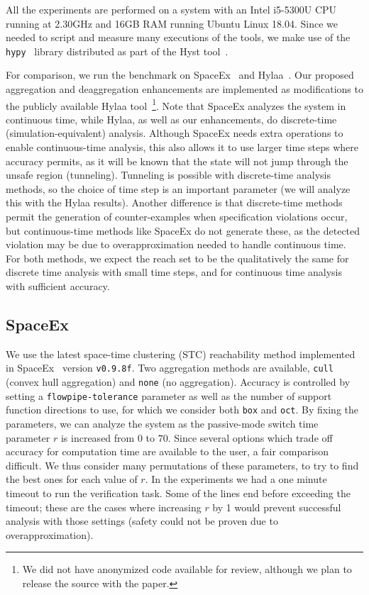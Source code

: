 All the experiments are performed on a system with an Intel i5-5300U CPU running at 2.30GHz and 16GB RAM running Ubuntu Linux 18.04.
%
Since we needed to script and measure many executions of the tools, we make use of the \texttt{hypy}~\cite{hypy} library distributed as part of the
Hyst tool~\cite{bak2015hscc}.

For comparison, we run the benchmark on SpaceEx~\cite{spaceex} and Hylaa~\cite{bak2017hscc}.
%
Our proposed aggregation and deaggregation enhancements are implemented as modifications to the publicly available
Hylaa tool~\footnote{We did not have anonymized code available for review, although we plan to release the source with the paper.}.
%
Note that SpaceEx analyzes the system in continuous time, while Hylaa, as well as our enhancements, do discrete-time (simulation-equivalent) analysis.
%
Although SpaceEx needs extra operations to enable continuous-time analysis, this also allows it to use larger time steps where accuracy permits, as
it will be known that the state will not jump through the unsafe region (tunneling).
%
Tunneling is possible with discrete-time analysis methods, so the choice of time step is an important parameter (we will analyze this with the Hylaa results).
%
Another difference is that discrete-time methods permit the generation of counter-examples when specification violations occur, but continuous-time methods
like SpaceEx do not generate these, as the detected violation may be due to overapproximation needed to handle continuous time.
%
For both methods, we expect the reach set to be the qualitatively the same for discrete time analysis with small time steps, and for continuous time analysis
with sufficient accuracy.

\subsection{SpaceEx}

We use the latest space-time clustering (STC) reachability method implemented in SpaceEx~\cite{frehse2013flowpipe} version \texttt{v0.9.8f}.
%
Two aggregation methods are available, \texttt{cull} (convex hull aggregation) and \texttt{none} (no aggregation).
%
Accuracy is controlled by setting a \texttt{flowpipe-tolerance} parameter as well as the number of support function directions to use, for which we consider
both \texttt{box} and \texttt{oct}.
%
By fixing the parameters, we can analyze the system as the passive-mode switch time parameter $r$ is increased from $0$ to $70$.
%
Since several options which trade off accuracy for computation time are available to the user, a fair comparison difficult.
%
We thus consider many permutations of these parameters, to try to find the best ones for each value of $r$.
%
In the experiments we had a one minute timeout to run the verification task.
%
Some of the lines end before exceeding the timeout; these are the cases where increasing $r$ by 1 would prevent
successful analysis with those settings (safety could not be proven due to overapproximation).

